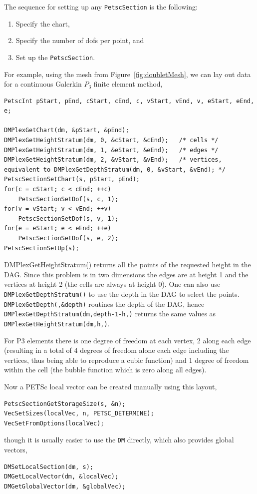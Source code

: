 The sequence for setting up any \lstinline{PetscSection} is the following:
\begin{enumerate}
  \item Specify the chart,
  \item Specify the number of dofs per point, and
  \item Set up the \lstinline{PetscSection}.
\end{enumerate}
For example, using the mesh from Figure~\ref{fig:doubletMesh}, we can lay out data for a continuous Galerkin $P_3$ finite
element method,
\begin{lstlisting}
PetscInt pStart, pEnd, cStart, cEnd, c, vStart, vEnd, v, eStart, eEnd, e;

DMPlexGetChart(dm, &pStart, &pEnd);
DMPlexGetHeightStratum(dm, 0, &cStart, &cEnd);   /* cells */
DMPlexGetHeightStratum(dm, 1, &eStart, &eEnd);   /* edges */
DMPlexGetHeightStratum(dm, 2, &vStart, &vEnd);   /* vertices, equivalent to DMPlexGetDepthStratum(dm, 0, &vStart, &vEnd); */
PetscSectionSetChart(s, pStart, pEnd);
for(c = cStart; c < cEnd; ++c)
    PetscSectionSetDof(s, c, 1);
for(v = vStart; v < vEnd; ++v)
    PetscSectionSetDof(s, v, 1);
for(e = eStart; e < eEnd; ++e)
    PetscSectionSetDof(s, e, 2);
PetscSectionSetUp(s);
\end{lstlisting}
DMPlexGetHeightStratum() returns all the points of the requested
height in the DAG. Since this problem is in two dimensions the edges
are at height 1 and the vertices at height 2 (the cells are always at
height 0). One can also use \lstinline{DMPlexGetDepthStratum()} to use the depth
in the DAG to select the points. \lstinline{DMPlexGetDepth(,&depth)} routines the depth of the DAG, hence
\lstinline{DMPlexGetDepthStratum(dm,depth-1-h,)} returns the same values as \lstinline{DMPlexGetHeightStratum(dm,h,)}.

For P3 elements there is one degree of freedom at each vertex, 2 along
each edge (resulting in a total of 4 degrees of freedom alone each
edge including the vertices, thus being able to reproduce a cubic
function) and 1 degree of freedom within the cell (the bubble function
which is zero along all edges).

Now a PETSc local vector can be created manually using this layout,
\begin{lstlisting}
PetscSectionGetStorageSize(s, &n);
VecSetSizes(localVec, n, PETSC_DETERMINE);
VecSetFromOptions(localVec);
\end{lstlisting}
though it is usually easier to use the \lstinline{DM} directly, which also provides global vectors,
\begin{lstlisting}
DMSetLocalSection(dm, s);
DMGetLocalVector(dm, &localVec);
DMGetGlobalVector(dm, &globalVec);
\end{lstlisting}


